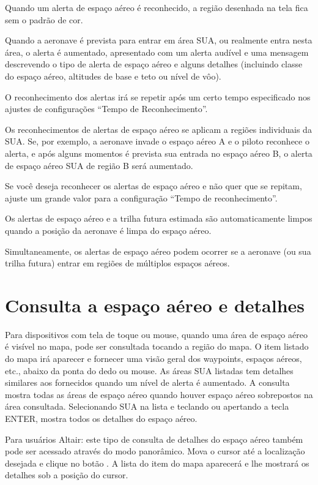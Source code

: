 Quando um alerta de espaço aéreo é reconhecido, a região desenhada na tela fica sem o padrão de cor.

Quando a aeronave é prevista para entrar em área SUA, ou realmente entra nesta área, o alerta é aumentado, apresentado com um alerta audível e uma mensagem descrevendo o tipo de alerta de espaço aéreo e alguns detalhes (incluindo classe do espaço aéreo, altitudes de base e teto ou nível de vôo).

O reconhecimento dos alertas irá se repetir após um certo tempo especificado nos ajustes de configurações “Tempo de Reconhecimento”.

Os reconhecimentos de alertas de espaço aéreo se aplicam a regiões individuais da SUA.  Se, por exemplo, a aeronave invade o espaço aéreo A e o piloto reconhece o alerta, e após alguns momentos é prevista sua entrada no espaço aéreo B, o alerta de espaço aéreo SUA de região B será aumentado.


\tip Se você deseja reconhecer os alertas de espaço aéreo e não quer que se repitam, ajuste um grande valor para a configuração “Tempo de reconhecimento”.

Os alertas de espaço aéreo e a trilha futura estimada são automaticamente limpos quando a posição da aeronave é limpa do espaço aéreo.

Simultaneamente, os alertas de espaço aéreo podem ocorrer se a aeronave (ou sua trilha futura) entrar em regiões de múltiplos espaços aéreos.  



\section{Consulta a espaço aéreo e detalhes}

Para dispositivos com tela de toque ou mouse, quando uma área de espaço aéreo é visível no mapa, pode ser consultada tocando a região do mapa.  O item listado do mapa irá aparecer e fornecer uma visão geral dos waypoints, espaços aéreos, etc., abaixo da ponta do dedo ou mouse.  As áreas SUA listadas tem detalhes similares aos fornecidos quando um nível de alerta é aumentado.  A consulta mostra todas as áreas de espaço aéreo quando houver espaço aéreo sobrepostos na área consultada.  
Selecionando SUA na lista e teclando   ou apertando a tecla ENTER, mostra todos os detalhes do espaço aéreo.

\tip Para usuários Altair: este tipo de consulta de detalhes do espaço aéreo também pode ser acessado através do modo panorâmico.  Mova o cursor até a localização desejada e clique no botão .  A lista do item do mapa aparecerá e lhe mostrará os detalhes sob a posição do cursor.

